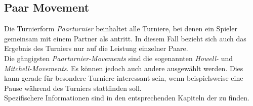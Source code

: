 \subsection{Paar Movement}\label{pair movement}

\noindent
Die Turnierform \textit{Paarturnier} beinhaltet alle Turniere, bei denen ein Spieler
gemeinsam mit einem Partner als \pa antritt. In diesem Fall bezieht sich
auch das Ergebnis des Turniers nur auf die Leistung einzelner Paare.\\[.2cm]

\noindent
Die gängigsten \textit{Paarturnier-Movements} sind die sogenannten \textit{Howell-} und
\textit{Mitchell-Movements}. Es können jedoch auch andere \bms ausgewählt werden.
Dies kann gerade für besondere Turniere interessant sein, wenn beispielsweise eine
Pause während des Turniers stattfinden soll.\\[.2cm]

\noindent
Spezifischere Informationen sind in den entsprechenden Kapiteln der \bms zu finden.
